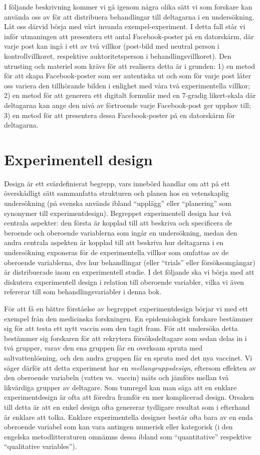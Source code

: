 \documentclass[
]{book}
\begin{document}
I följande beskrivning kommer vi gå igenom några olika sätt vi som forskare kan använda oss av för att distribuera behandlingar till deltagarna i en undersökning. Låt oss därvid börja med vårt invanda exempel-experiment. I detta fall står vi inför utmaningen att presentera ett antal Facebook-poster på en datorskärm, där varje post kan ingå i ett av två villkor (post-bild med neutral person i kontrollvillkoret, respektive auktoritetsperson i behandlingsvillkoret). Den utrusting och materiel som krävs för att realisera detta är i grunden: 1) en metod för att skapa Facebook-poster som ser autentiska ut och som för varje post låter oss variera den tillhörande bilden i enlighet med våra två experimentella villkor; 2) en metod för att generera ett digitalt formulär med en 7-gradig likert-skala där deltagarna kan ange den nivå av förtroende varje Facebook-post ger upphov till; 3) en metod för att presentera dessa Facebook-poster på en datorskärm för deltagarna.

\hypertarget{sec07.5}{%
\section{Experimentell design}\label{sec07.5}}

Design är ett svårdefinierat begrepp, vars innebörd handlar om att på ett överskådligt sätt sammanfatta strukturen och planen hos en vetenskaplig undersökning (på svenska används ibland ``upplägg'' eller ``planering'' som synonymer till experimentdesign). Begreppet experimentell design har två centrala aspekter: den första är kopplad till att beskriva och specificera de beroende och oberoende variablerna som ingår en undersökning, medan den andra centrala aspekten är kopplad till att beskriva hur deltagarna i en undersökning exponeras för de experimentella villkor som omfattas av de oberoende variablerna, dvs hur behandlingar (eller ``trials'' eller försöksomgångar) är distribuerade inom en experimentell studie. I det följande ska vi börja med att diskutera experimentell design i relation till oberoende variabler, vilka vi även refererar till som behandlingsvariabler i denna bok.

För att få en bättre förståelse av begreppet experimentdesign börjar vi med ett exempel från den medicinska forskningen. En epidemiologisk forskare bestämmer sig för att testa ett nytt vaccin som den tagit fram. För att undersöka detta bestämmer sig forskaren för att rekrytera försöksdeltagare som sedan delas in i två grupper, varav den ena gruppen får en overksam spruta med saltvattenlösning, och den andra gruppen får en spruta med det nya vaccinet. Vi säger därför att detta experiment har en \emph{mellangruppsdesign}, eftersom effekten av den oberoende variabeln (vatten vs.~vaccin) mäts och jämförs mellan två likvärdiga grupper av deltagare. Som tumregel kan man säga att en enklare experimentdesign är ofta att föredra framför en mer komplicerad design. Orsaken till detta är att en enkel design ofta genererar tydligare resultat som i efterhand är enklare att tolka. Enklare experimentella designer består ofta bara av en enda oberoende variabel som kan vara antingen numerisk eller kategorisk (i den engelska metodlitteraturen omnämns dessa ibland som ``quantitative'' respektive ``qualitative variables'').
\end{document}
